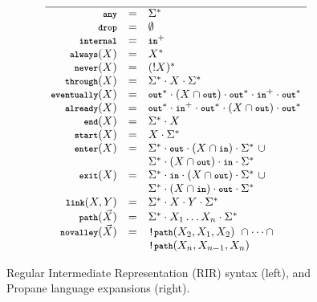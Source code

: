\documentclass{sig-alternate-10pt}
\newcommand{\KW}[1]{\texttt{\small\bfseries{#1}}}
\newcommand{\Any}{\KW{any}}
\newcommand{\None}{\KW{drop}}
\newcommand{\In}{\KW{in}}
\newcommand{\Out}{\KW{out}}
\newcommand{\NOT}{\texttt{!}}
\newcommand{\Exit}{\KW{exit}}
\newcommand{\End}{\KW{end}}
\newcommand{\Start}{\KW{start}}
\newcommand{\Enter}{\KW{enter}}
\newcommand{\Eventually}{\KW{eventually}}
\newcommand{\Already}{\KW{already}}
\newcommand{\Internal}{\KW{internal}}
\newcommand{\Never}{\KW{never}}
\newcommand{\Always}{\KW{always}}
\newcommand{\Through}{\KW{through}}
\newcommand{\LinkKW}{\KW{link}}
\newcommand{\PathKW}{\KW{path}}
\newcommand{\Novalley}{\KW{novalley}}
\begin{document}
\begin{figure}[t]
\begin{minipage}[t]{.45\linewidth}
  \end{minipage}
  ~~
  \vrule
  ~~
  \begin{minipage}[t]{.5\linewidth}\small
  \vspace*{-1\baselineskip}
  \[\begin{array}{rcl}
    \hline
    \Any               & = & \Sigma^* \\
    \None              & = & \emptyset \\
    \Internal          & = & \In^+ \\
    \Always(X)         & = & X^* \\
    \Never(X)          & = & (!X)^* \\
    \Through(X)        & = & \Sigma^* \cdot X \cdot \Sigma^* \\
    \Eventually(X)     & = & \Out^* \cdot (X \cap \Out) \cdot \Out^* \cdot \In^+ \cdot \Out^* \\
    \Already(X)        & = & \Out^* \cdot \In^+ \cdot \Out^* \cdot (X \cap \Out) \cdot \Out^* \\
    \End(X)            & = & \Sigma^* \cdot X \\
    \Start(X)          & = & X \cdot \Sigma^* \\
    \Enter(X)          & = & \Sigma^* \cdot \Out \cdot (X \cap \In) \cdot \Sigma^* ~ \cup \\
                       &   & \Sigma^* \cdot (X \cap \Out) \cdot \In \cdot \Sigma^* \\
    \Exit(X)           & = & \Sigma^* \cdot \In \cdot (X \cap \Out) \cdot \Sigma^* ~ \cup \\
                       &   & \Sigma^* \cdot (X \cap \In) \cdot \Out \cdot \Sigma^* \\
    \LinkKW(X,Y)       & = & \Sigma^* \cdot X \cdot Y \cdot \Sigma^* \\
    \PathKW(\vec{X})   & = & \Sigma^* \cdot X_1 \dots X_n \cdot \Sigma^* \\
    \Novalley(\vec{X}) & = & \NOT\PathKW(X_2,X_1,X_2) ~ \cap \dots \cap \\
                       &   & \NOT\PathKW(X_n,X_{n-1},X_n) \\
  \end{array} \]%

  \end{minipage}%

  \hrulefill%

  \caption{Regular Intermediate Representation (RIR) syntax (left), and
           Propane language expansions (right).}
  \label{fig:rir-syntax}
\end{figure}%
\end{document}
